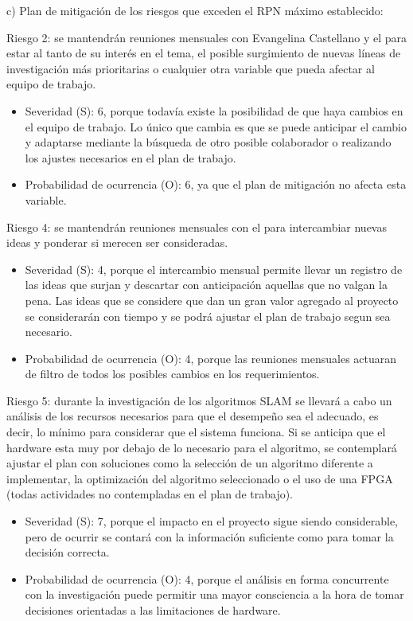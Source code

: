 \documentclass[
11pt, %
codirector, %
]{charter}
\begin{document}
c) Plan de mitigación de los riesgos que exceden el RPN máximo establecido:

Riesgo 2: se mantendrán reuniones mensuales con Evangelina Castellano y el \clientename{} para estar al tanto de su interés en el tema, el posible surgimiento de nuevas líneas de investigación más prioritarias o cualquier otra variable que pueda afectar al equipo de trabajo.
\begin{itemize}
	\item Severidad (S): 6, porque todavía existe la posibilidad de que haya cambios en el equipo de trabajo. Lo único que cambia es que se puede anticipar el cambio y adaptarse mediante la búsqueda de otro posible colaborador o realizando los ajustes necesarios en el plan de trabajo.
	\item Probabilidad de ocurrencia (O): 6, ya que el plan de mitigación no afecta esta variable.
\end{itemize}

Riesgo 4: se mantendrán reuniones mensuales con el \clientename{} para intercambiar nuevas ideas y ponderar si merecen ser consideradas.
\begin{itemize}
	\item Severidad (S): 4, porque el intercambio mensual permite llevar un registro de las ideas que surjan y descartar con anticipación aquellas que no valgan la pena. Las ideas que se considere que dan un gran valor agregado al proyecto se considerarán con tiempo y se podrá ajustar el plan de trabajo segun sea necesario.
	\item Probabilidad de ocurrencia (O): 4, porque las reuniones mensuales actuaran de filtro de todos los posibles cambios en los requerimientos.
\end{itemize}

Riesgo 5: durante la investigación de los algoritmos SLAM se llevará a cabo un análisis de los recursos necesarios para que el desempeño sea el adecuado, es decir, lo mínimo para considerar que el sistema funciona. Si se anticipa que el hardware esta muy por debajo de lo necesario para el algoritmo, se contemplará ajustar el plan con soluciones como la selección de un algoritmo diferente a implementar, la optimización del algoritmo seleccionado o el uso de una FPGA (todas actividades no contempladas en el plan de trabajo).
\begin{itemize}
	\item Severidad (S): 7, porque el impacto en el proyecto sigue siendo considerable, pero de ocurrir se contará con la información suficiente como para tomar la decisión correcta.
	\item Probabilidad de ocurrencia (O): 4, porque el análisis en forma concurrente con la investigación puede permitir una mayor consciencia a la hora de tomar decisiones orientadas a las limitaciones de hardware.
\end{itemize}
\end{document}
